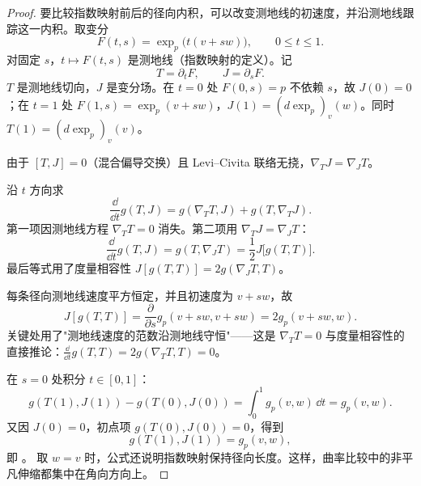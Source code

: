 \begin{proof}
要比较指数映射前后的径向内积，可以改变测地线的初速度，并沿测地线跟踪这一内积。取变分
\begin{equation*}
F(t,s)=\exp_p\bigl(t(v+s w)\bigr),
\qquad 0\le t\le1.
\end{equation*}
对固定 $s$，$t\mapsto F(t,s)$ 是测地线（指数映射的定义）。记
\begin{equation*}
T=\partial_tF,
\qquad
J=\partial_sF.
\end{equation*}
$T$ 是测地线切向，$J$ 是变分场。在 $t=0$ 处 $F(0,s)=p$ 不依赖 $s$，故 $J(0)=0$；在 $t=1$ 处 $F(1,s)=\exp_p(v+sw)$，$J(1)=(d\exp_p)_v(w)$。同时 $T(1)=(d\exp_p)_v(v)$。

由于 $[T,J]=0$（混合偏导交换）且 Levi--Civita 联络无挠，$\nabla_TJ=\nabla_JT$。

沿 $t$ 方向求
\begin{equation*}
\frac{\dd}{\dd t}g(T,J)
=g(\nabla_TT,J)+g(T,\nabla_TJ).
\end{equation*}
第一项因测地线方程 $\nabla_TT=0$ 消失。第二项用 $\nabla_TJ=\nabla_JT$：
\begin{equation*}
\frac{\dd}{\dd t}g(T,J)
=g(T,\nabla_JT)
=\frac12 J\bigl[g(T,T)\bigr].
\end{equation*}
最后等式用了度量相容性 $J[g(T,T)]=2g(\nabla_JT,T)$。

每条径向测地线速度平方恒定，并且初速度为 $v+s w$，故
\begin{equation*}
J[g(T,T)]
=\frac{\partial}{\partial s}g_p(v+s w,v+s w)
=2g_p(v+s w,w).
\end{equation*}
关键处用了"测地线速度的范数沿测地线守恒"——这是 $\nabla_TT=0$ 与度量相容性的直接推论：$\frac{\dd}{\dd t}g(T,T)=2g(\nabla_TT,T)=0$。

在 $s=0$ 处积分 $t\in[0,1]$：
\begin{equation*}
g(T(1),J(1))-g(T(0),J(0))
=\int_0^1 g_p(v,w)\,\dd t
=g_p(v,w).
\end{equation*}
又因 $J(0)=0$，初点项 $g(T(0),J(0))=0$，得到
\begin{equation*}
g(T(1),J(1))=g_p(v,w),
\end{equation*}
即 。
取 $w=v$ 时，公式还说明指数映射保持径向长度。这样，曲率比较中的非平凡伸缩都集中在角向方向上。
\end{proof}

